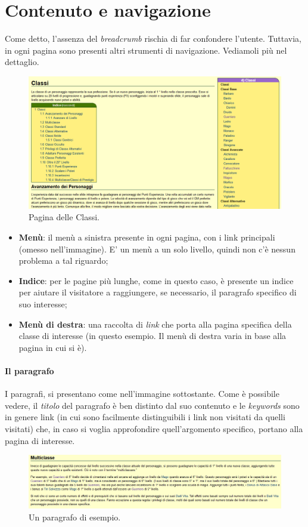 \section{Contenuto e navigazione}

Come detto, l'assenza del \emph{breadcrumb} rischia di far confondere l'utente.
Tuttavia, in ogni pagina sono presenti altri strumenti di navigazione. Vediamoli più nel 
dettaglio.

\begin{figure}[hbt]
	\includegraphics[width=\textwidth]{img/classi.png}
	\caption{Pagina delle Classi.}
\end{figure}

\begin{itemize}
	\item \textbf{Menù}: il menù a sinistra presente in ogni pagina, con i link principali (omesso nell'immagine). E' un menù a un solo livello, quindi non c'è nessun problema a tal riguardo;
	\item \textbf{Indice}: per le pagine più lunghe, come in questo caso, è presente un indice per 
	aiutare il visitatore a raggiungere, se necessario, il paragrafo specifico di suo interesse;
	\item \textbf{Menù di destra}: una raccolta di \emph{link} che porta alla pagina specifica della
	classe di interesse (in questo esempio. Il menù di destra varia in base alla pagina in cui si è).
\end{itemize}

\clearpage

\paragraph{Il paragrafo} I paragrafi, si presentano come nell'immagine sottostante. Come è possibile
vedere, il \emph{titolo} del paragrafo è ben distinto dal suo contenuto e le \emph{keywords} sono in genere link (in cui sono facilmente distinguibili i link non visitati da quelli visitati) che, in caso si voglia approfondire quell'argomento specifico, portano alla pagina di interesse.

\begin{figure}[hbt]
	\includegraphics[width=\textwidth]{img/paragrafo.png}
	\caption{Un paragrafo di esempio.}
\end{figure}

